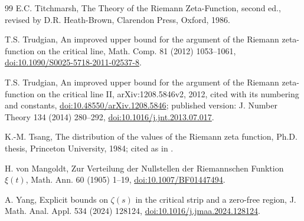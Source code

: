 \documentclass[11pt,a4paper]{article}
\makeatletter
\numberwithin{equation}{section}
\DeclareRobustCommand{\CGcite}[2][]{\if\relax\detokenize{#1}\relax\cite{#2}\else\cite[#1]{#2}\fi}
\newcommand{\CG@getbib}[1]{\@ifundefined{CGBib@#1}{#1}{\csname CGBib@#1\endcsname}}
\DeclareRobustCommand{\CGcite}[2][]{\pdftooltip{\if\relax\detokenize{#1}\relax\cite{#2}\else\cite[#1]{#2}\fi}{\CG@getbib{#2}}}
\theoremstyle{definition}
\theoremstyle{remark}
\makeatother
\begin{document}
\begin{thebibliography}{99}
 E.C. Titchmarsh, The Theory of the Riemann Zeta-Function, second ed., revised by D.R. Heath-Brown, Clarendon Press, Oxford, 1986.

 T.S. Trudgian, An improved upper bound for the argument of the Riemann zeta-function on the critical line, Math. Comp. 81 (2012) 1053--1061, \href{https://doi.org/10.1090/S0025-5718-2011-02537-8}{doi:10.1090/S0025-5718-2011-02537-8}.

 T.S. Trudgian, An improved upper bound for the argument of the Riemann zeta-function on the critical line II, arXiv:1208.5846v2, 2012, cited with its numbering and constants, \href{https://doi.org/10.48550/arXiv.1208.5846}{doi:10.48550/arXiv.1208.5846}; published version: J. Number Theory 134 (2014) 280--292, \href{https://doi.org/10.1016/j.jnt.2013.07.017}{doi:10.1016/j.jnt.2013.07.017}.

 K.-M. Tsang, The distribution of the values of the Riemann zeta function, Ph.D. thesis, Princeton University, 1984; cited as in \CGcite[\S3]{FazzariGerspachMinelli2025}.

 H. von Mangoldt, Zur Verteilung der Nullstellen der Riemannschen Funktion $\xi(t)$, Math. Ann. 60 (1905) 1--19, \href{https://doi.org/10.1007/BF01447494}{doi:10.1007/BF01447494}.

 A. Yang, Explicit bounds on $\zeta(s)$ in the critical strip and a zero-free region, J. Math. Anal. Appl. 534 (2024) 128124, \href{https://doi.org/10.1016/j.jmaa.2024.128124}{doi:10.1016/j.jmaa.2024.128124}.

\end{thebibliography}
\end{document}
